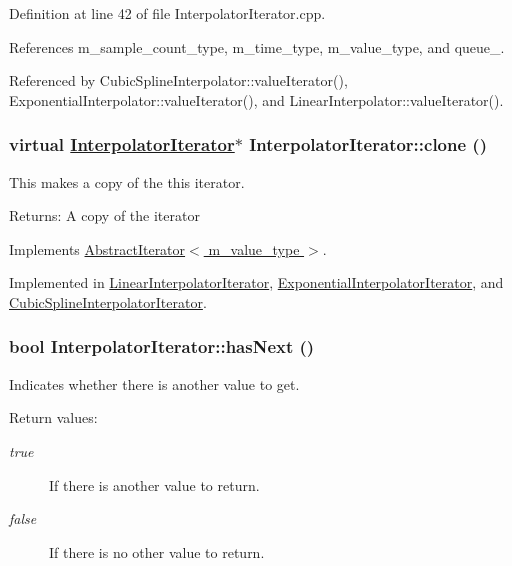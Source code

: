 Definition at line 42 of file Interpolator\-Iterator.cpp.

References m\_\-sample\_\-count\_\-type, m\_\-time\_\-type, m\_\-value\_\-type, and queue\_\-.

Referenced by Cubic\-Spline\-Interpolator::value\-Iterator(), Exponential\-Interpolator::value\-Iterator(), and Linear\-Interpolator::value\-Iterator().\hypertarget{classInterpolatorIterator_a2}{
\subsubsection[clone]{\setlength{\rightskip}{0pt plus 5cm}virtual \hyperlink{classInterpolatorIterator}{Interpolator\-Iterator}$\ast$ Interpolator\-Iterator::clone ()}}
\label{classInterpolatorIterator_a2}


This makes a copy of the this iterator. \begin{Desc}
\item[Returns:]A copy of the iterator \end{Desc}


Implements \hyperlink{classAbstractIterator_a0}{Abstract\-Iterator$<$ m\_\-value\_\-type $>$}.

Implemented in \hyperlink{classLinearInterpolatorIterator_a1}{Linear\-Interpolator\-Iterator}, \hyperlink{classExponentialInterpolatorIterator_a1}{Exponential\-Interpolator\-Iterator}, and \hyperlink{classCubicSplineInterpolatorIterator_a1}{Cubic\-Spline\-Interpolator\-Iterator}.\hypertarget{classInterpolatorIterator_a3}{
\subsubsection[hasNext]{\setlength{\rightskip}{0pt plus 5cm}bool Interpolator\-Iterator::has\-Next ()}}
\label{classInterpolatorIterator_a3}


Indicates whether there is another value to get. \begin{Desc}
\item[Return values:]
\begin{description}
\item[{\em true}]If there is another value to return. \item[{\em false}]If there is no other value to return. \end{description}
\end{Desc}


